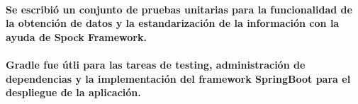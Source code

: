   \paragraph{Se escribió un conjunto de pruebas unitarias para la funcionalidad de la obtención de datos y la estandarización de la información con la ayuda de Spock Framework.}

  \paragraph{Gradle fue útli para las tareas de testing, administración de dependencias y la implementación del framework SpringBoot para el despliegue de la aplicación.}

